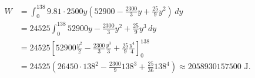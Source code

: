 \documentclass[
  a4paper,
]{scrreport}
\theoremstyle{definition}
\theoremstyle{remark}
\begin{document}
\begin{tcolorbox}
\begin{align*}
W 
&= \int_0^{138} 9.81\cdot 2500 y \left(52900 -\frac{2300}{3}y +\frac{25}{9}y^2\right)\,dy \\
&= 24525 \int_0^{138} 52900y -\frac{2300}{3}y^2 +\frac{25}{9}y^3\,dy \\
&= 24525 \left[52900\frac{y^2}{2} -\frac{2300}{3}\frac{y^3}{3} +\frac{25}{9}\frac{y^4}{4}\right]_0^{138} \\
&= 24525\left(26450 \cdot 138^2 - \frac{2300}{9} 138^3 + \frac{25}{36} 138^4\right) 
\approx 2058930157500 \mbox{ J}.
\end{align*}

\end{tcolorbox}
\end{document}

